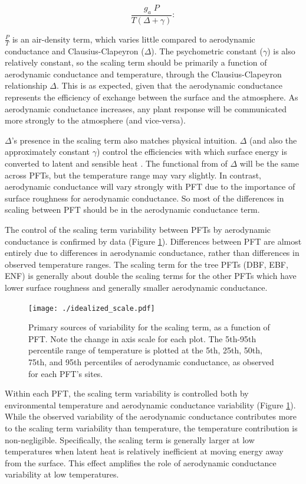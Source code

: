 \documentclass[draft,linenumbers]{gcbjournal}
\begin{document}
\begin{equation}
  \frac{g_a \; P}{T(\Delta + \gamma)}:
\end{equation}

$\frac{P}{T}$ is an air-density term, which varies little compared to aerodynamic conductance and Clausius-Clapeyron ($\Delta$). The psychometric constant ($\gamma$) is also relatively constant, so the scaling term should be primarily a function of aerodynamic conductance and temperature, through the Clausius-Clapeyron relationship $\Delta$. This is as expected, given that the aerodynamic conductance represents the efficiency of exchange between the surface and the atmosphere. As aerodynamic conductance  increases, any plant response will be communicated more strongly to the atmosphere (and vice-versa).

$\Delta$'s presence in the scaling term also matches physical intuition. $\Delta$ (and also the approximately constant $\gamma$) control the efficiencies with which surface energy is converted to latent and sensible heat \citep{Monteith_1965}. The functional from of $\Delta$ will be the same across PFTs, but the temperature range may vary slightly. In contrast, aerodynamic conductance will vary strongly with PFT due to the importance of surface roughness for aerodynamic conductance. So most of the differences in scaling between PFT should be in the aerodynamic conductance term. 

The control of the scaling term variability between PFTs by aerodynamic conductance is confirmed by data (Figure \ref{scale_vary}). Differences between PFT are almost entirely due to differences in aerodynamic conductance, rather than differences in observed temperature ranges. The scaling term for the tree PFTs (DBF, EBF, ENF) is generally about double the scaling terms for the other PFTs which have lower surface roughness and generally smaller aerodynamic conductance.

\begin{figure}
\centering
\texttt{[image: ./idealized\_scale.pdf]}
\caption{Primary sources of variability for the scaling term, as a function of PFT. Note the change in axis scale for each plot. The 5th-95th percentile range of temperature is plotted at the 5th, 25th, 50th, 75th, and 95th percentiles of aerodynamic conductance, as observed for each PFT's sites.}
\label{scale_vary}
\end{figure}

Within each PFT, the scaling term variability is controlled both by environmental temperature and aerodynamic conductance variability (Figure \ref{scale_vary}). While the observed variability of the aerodynamic conductance contributes more to the scaling term variability than temperature, the temperature contribution is non-negligible. Specifically, the scaling term is generally larger at low temperatures when latent heat is relatively inefficient at moving energy away from the surface. This effect amplifies the role of aerodynamic conductance variability at low temperatures.
\end{document}
